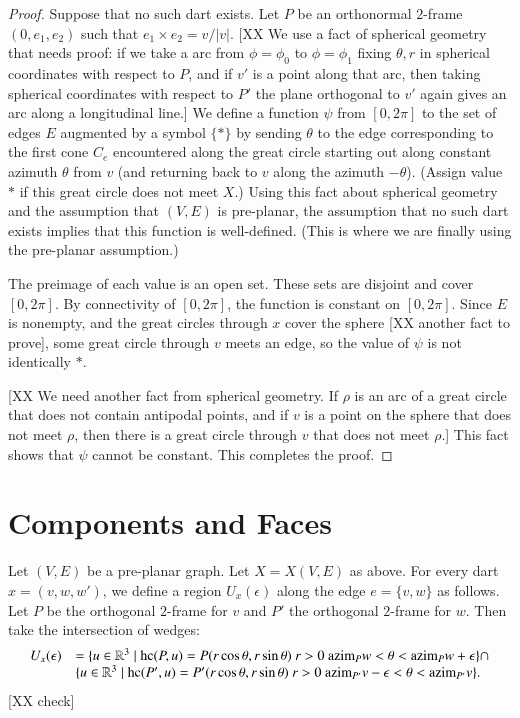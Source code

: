 \begin{proof}  Suppose that no such dart exists.  Let $P$ be an
orthonormal $2$-frame $(0,e_1,e_2)$ such that $e_1\times e_2 =
v/|v|$.  [XX We use a fact of spherical geometry that needs proof:
if we take a arc from $\phi=\phi_0$ to $\phi=\phi_1$ fixing
$\theta,r$ in spherical coordinates with respect to $P$, and if $v'$
is a point along that arc, then taking spherical coordinates with
respect to $P'$ the plane orthogonal to $v'$ again gives an arc
along a longitudinal line.]  We define a function $\psi$ from
$[0,2\pi]$ to the set of edges $E$ augmented by a symbol $\{*\}$ by
sending $\theta$ to the edge corresponding to the first cone $C_e$
encountered along the great circle starting out along constant
azimuth $\theta$ from $v$ (and returning back to $v$ along the
azimuth $-\theta$). (Assign value $*$ if this great circle does not
meet $X$.)   Using this fact about spherical geometry and the
assumption that $(V,E)$ is pre-planar, the assumption that no such
dart exists implies that this function is well-defined.  (This is
where we are finally using the pre-planar assumption.)

The preimage of each value is an open set.  These sets are disjoint
and cover $[0,2\pi]$.  By connectivity of $[0,2\pi]$, the function
is constant on $[0,2\pi]$.  Since $E$ is nonempty, and the great
circles through $x$ cover the sphere [XX another fact to prove],
some great circle through $v$ meets an edge, so the value of $\psi$
is not identically $*$.

[XX We need another fact from spherical geometry.  If $\rho$ is an
arc of a great circle that does not contain antipodal points, and if
$v$ is a point on the sphere that does not meet $\rho$, then there
is a great circle through $v$ that does not meet $\rho$.]  This fact
shows that $\psi$ cannot be constant.  This completes the proof.
\end{proof}

\section{Components and Faces}

Let $(V,E)$ be a pre-planar graph.  Let $X=X(V,E)$ as above. For
every dart $x=(v,w,w')$, we define a region $U_x(\epsilon)$ along
the edge $e = \{v,w\}$ as follows. Let $P$ be the orthogonal
$2$-frame for $v$ and $P'$ the orthogonal $2$-frame for $w$.  Then
take the intersection of wedges:
    $$\begin{array}{lll}
    U_x(\epsilon) &= \{u \in\mathbb{R}^3 \mid {\operatorname{hc}}(P, u) = P(r\cos\theta,r\sin\theta)\
       r > 0\ {\operatorname{azim}}_P w < \theta < {\operatorname{azim}}_P w + \epsilon\}
       \cap\\
       &\{u \in\mathbb{R}^3 \mid {\operatorname{hc}}(P', u) = P'(r\cos\theta,r\sin\theta)\
       r > 0\ {\operatorname{azim}}_{P'} v -\epsilon < \theta < {\operatorname{azim}}_{P'} v\}.
    \end{array}$$
[XX check]

